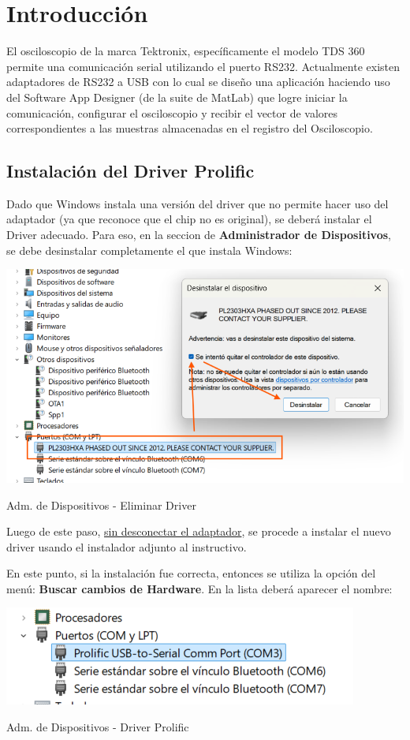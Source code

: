 \chapter{Introducción}
El osciloscopio de la marca Tektronix, específicamente el modelo TDS 360 permite una comunicación serial utilizando el puerto RS232. Actualmente existen adaptadores de RS232 a USB con lo cual se diseño una aplicación haciendo uso del Software App Designer (de la suite de MatLab) que logre iniciar la comunicación, configurar el osciloscopio y recibir el vector de valores correspondientes a las muestras almacenadas en el registro del Osciloscopio.

\section{Instalación del Driver Prolific}
Dado que Windows instala una versión del driver que no permite hacer uso del adaptador (ya que reconoce que el chip no es original), se deberá instalar el Driver adecuado. Para eso, en la seccion de \textbf{Administrador de Dispositivos}, se debe desinstalar completamente el que instala Windows:

\vspace{5mm}

\begin{center}
	\includegraphics[width=0.8\columnwidth]{images/Driver_01.png}
	\captionsetup{type=figure}
	\caption{Adm. de Dispositivos - Eliminar Driver}
	\label{fig:eliminar-driver}
\end{center}

Luego de este paso, \underline{sin desconectar el adaptador}, se procede a instalar el nuevo driver usando el instalador adjunto al instructivo.

En este punto, si la instalación fue correcta, entonces se utiliza la opción del menú: \textbf{Buscar cambios de Hardware}. En la lista deberá aparecer el nombre:

\begin{center}
	\includegraphics[width=0.45\columnwidth]{images/Driver_02.png}
	\captionsetup{type=figure}
	\caption{Adm. de Dispositivos - Driver Prolific}
	\label{fig:listado-driver-ok}
\end{center}


